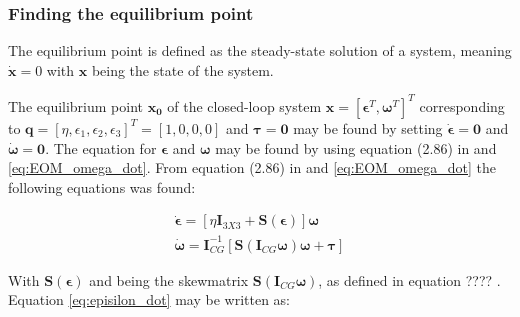 \subsubsection*{Finding the equilibrium point}

The equilibrium point is defined as the steady-state solution of a system, meaning $\dot{\mathbf{x}} = 0$ with $\mathbf{x}$ being the state of the system.


The equilibrium point $\mathbf{x_0}$ of the closed-loop system $\mathbf{x} = [ \boldsymbol{\epsilon}^T, \boldsymbol{\omega}^T]^T$ corresponding to $\mathbf{q} = [\eta,\epsilon_1, \epsilon_2, \epsilon_3]^T = [1, 0, 0, 0]$ and $\boldsymbol{\tau} = \boldsymbol{0}$ may be found by setting $\dot{\boldsymbol{\epsilon}} = \mathbf{0}$ and $\dot{\boldsymbol{\omega}} = \mathbf{0}$. The equation for $\boldsymbol{\epsilon}$ and $\boldsymbol{\omega}$ may be found by using equation (2.86) in \cite{Fossen2011} and \eqref{eq:EOM_omega_dot}. From equation (2.86) in \cite{Fossen2011} and \eqref{eq:EOM_omega_dot} the following equations was found:


\begin{subequations}
\label{eq:x_dot}
	\begin{align}
		\dot{\boldsymbol{\epsilon}} =  [ \eta \mathbf{I}_{3X3} + \mathbf{S}(\boldsymbol{\epsilon}) ] \boldsymbol{\omega}  \label{eq:episilon_dot} \\
		 \dot{\boldsymbol{\omega}} = \mathbf{I}_{CG}^{-1} [\mathbf{S} (\mathbf{I}_{CG} \boldsymbol{\omega} ) \boldsymbol{\omega} +  \boldsymbol{\tau} ] \label{eq:omega_dot}
	\end{align}	
\end{subequations}


With $\mathbf{S} (\boldsymbol{\epsilon})$ and being the skewmatrix $\mathbf{S} (\mathbf{I}_{CG} \boldsymbol{\omega} ) $, as defined in \cite{Fossen2011} equation ????  . Equation \eqref{eq:episilon_dot} may be written as:

